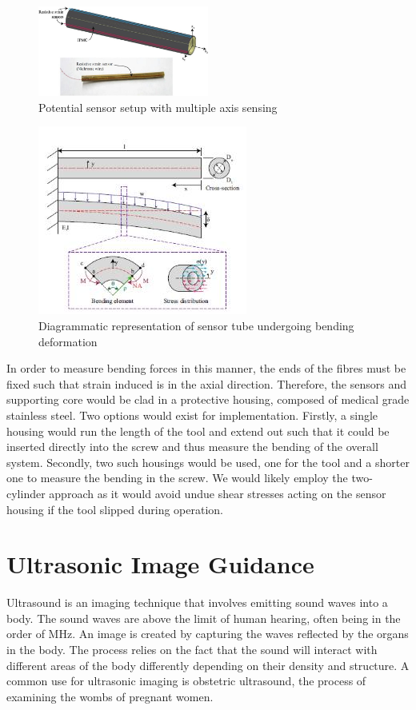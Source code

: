\documentclass[conference, a4paper]{IEEEtran}
\begin{document}
\begin{figure}[h!]
	\centering
	\includegraphics[width=0.5\textwidth]{assets/sensorSetup.jpg}
	\caption{Potential sensor setup with multiple axis sensing\cite{Tsugawa2015}}
	\label{fig:potential}
\end{figure}

\begin{figure}[h!]
	\centering
	\includegraphics{assets/bendingDeformation.jpg}
	\caption{Diagrammatic representation of sensor tube undergoing bending deformation\cite{Tsugawa2015}}
	\label{fig:deviation}
\end{figure}

In order to measure bending forces in this manner, the ends of the fibres must be fixed such that strain induced
is in the axial direction. Therefore, the sensors and supporting core would be clad in a protective housing,
composed of medical grade stainless steel. Two options would exist for implementation. Firstly, a single
housing would run the length of the tool and extend out such that it could be inserted directly into the screw and
thus measure the bending of the overall system. Secondly, two such housings would be used, one for the tool
and a shorter one to measure the bending in the screw. We would likely employ the two-cylinder approach as it
would avoid undue shear stresses acting on the sensor housing if the tool slipped during operation.


\section{Ultrasonic Image Guidance}
Ultrasound is an imaging technique that involves emitting sound waves into a
body. The sound waves are above the limit of human hearing, often being in
the order of MHz\cite{Misaridis2005}. An image is created by capturing the waves reflected
by the organs in the body. 
The process relies on the fact that the sound will interact with
different areas of the body differently depending on their density and
structure\cite{ultraHist}. A common use for ultrasonic imaging is obstetric ultrasound,
the process of examining the wombs of pregnant women. 
\end{document}
